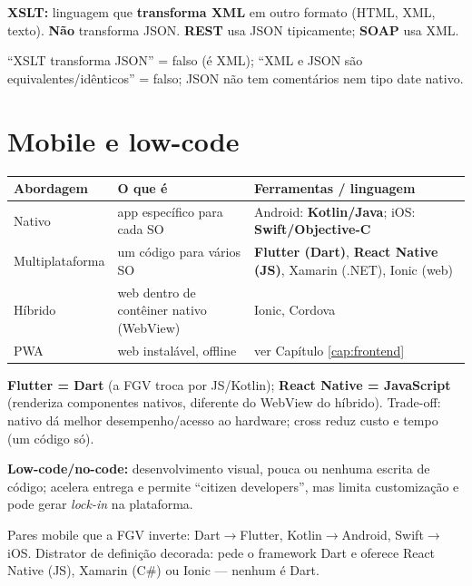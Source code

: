 \textbf{XSLT:} linguagem que \textbf{transforma XML} em outro formato (HTML,
XML, texto). \textbf{Não} transforma JSON. \textbf{REST} usa JSON
tipicamente; \textbf{SOAP} usa XML.

\begin{pegadinha}
``XSLT transforma JSON'' = falso (é XML); ``XML e JSON são
equivalentes/idênticos'' = falso; JSON não tem comentários nem tipo date
nativo.
\end{pegadinha}

\section{Mobile e low-code}

\begin{center}
\begin{tabular}{@{}p{2.6cm}p{3.4cm}p{4.4cm}@{}}
\toprule
\textbf{Abordagem} & \textbf{O que é} & \textbf{Ferramentas / linguagem} \\
\midrule
Nativo & app específico para cada SO & Android: \textbf{Kotlin/Java}; iOS: \textbf{Swift/Objective-C} \\
Multiplataforma & um código para vários SO & \textbf{Flutter (Dart)}, \textbf{React Native (JS)}, Xamarin (.NET), Ionic (web) \\
Híbrido & web dentro de contêiner nativo (WebView) & Ionic, Cordova \\
PWA & web instalável, offline & ver Capítulo \ref{cap:frontend} \\
\bottomrule
\end{tabular}
\end{center}

\textbf{Flutter = Dart} (a FGV troca por JS/Kotlin); \textbf{React Native =
JavaScript} (renderiza componentes nativos, diferente do WebView do
híbrido). Trade-off: nativo dá melhor desempenho/acesso ao hardware; cross
reduz custo e tempo (um código só).

\textbf{Low-code/no-code:} desenvolvimento visual, pouca ou nenhuma escrita
de código; acelera entrega e permite ``citizen developers'', mas limita
customização e pode gerar \textit{lock-in} na plataforma.

\begin{pegadinha}
Pares mobile que a FGV inverte: Dart$\to$Flutter, Kotlin$\to$Android,
Swift$\to$iOS. Distrator de definição decorada: pede o framework Dart e
oferece React Native (JS), Xamarin (C\#) ou Ionic --- nenhum é Dart.
\end{pegadinha}


